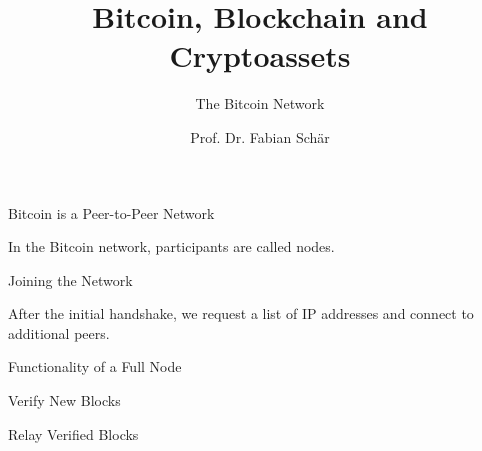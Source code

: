 \documentclass[handout]{beamer}
\title{Bitcoin, Blockchain and Cryptoassets}
\subtitle{The Bitcoin Network}
\author{Prof. Dr. Fabian Schär}
\institute{University of Basel}
\begin{document}
\thispagestyle{empty}
\begin{frame}[noframenumbering]
	\titlepage
\end{frame}

\begin{frame}{Bitcoin is a Peer-to-Peer Network}
	\centering
	\begin{tikzpicture}[scale=1, every node/.style={scale=1}]
		
	\end{tikzpicture}
	
	\vspace{0.5cm}
	
	In the Bitcoin network, participants are called \color{focus}nodes\color{black}.
\end{frame}

\begin{frame}{Joining the Network}
	\begin{center}
		\begin{tikzpicture}[scale=1, every node/.style={scale=1}]
			
		\end{tikzpicture}
	\end{center}

	\vspace{1cm}
	
	After the initial handshake, we request a list of IP addresses and connect to additional peers.
\end{frame}

\begin{frame}{Functionality of a Full Node}
	\centering
	\begin{tikzpicture}[scale=1, every node/.style={scale=1}]
		
	\end{tikzpicture}
\end{frame}


\begin{frame}{Verify New Blocks}
	
	\begin{tikzpicture}[scale=1, every node/.style={scale=1}]
		
	\end{tikzpicture}
\end{frame}

\begin{frame}{Relay Verified Blocks}
	
	\begin{tikzpicture}[scale=1, every node/.style={scale=1}]
		
	\end{tikzpicture}
\end{frame}
\end{document}
